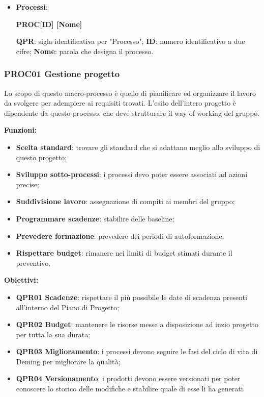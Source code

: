 \documentclass[../piano_di_qualifica.tex]{subfiles}
\begin{document}
\begin{itemize}
	\item \textbf{Processi}:
	      \begin{center}
		      \textbf{PROC[ID] [Nome]}
	      \end{center}
	      \subitem \textbf{QPR}: sigla identificativa per "Processo";
	      \subitem \textbf{ID}: numero identificativo a due cifre;
	      \subitem \textbf{Nome}: parola che designa il processo.
\end{itemize}

\subsubsection{PROC01 Gestione progetto}
Lo scopo di questo macro-processo è quello di pianificare ed organizzare il lavoro da svolgere per adempiere ai requisiti trovati. L'esito dell'intero progetto è dipendente da questo processo, che deve strutturare il way of working del gruppo.

\textbf{Funzioni:}
\smallbreak
\begin{itemize}
	\item \textbf{Scelta standard}: trovare gli standard che si adattano meglio allo sviluppo di questo progetto;
	\item \textbf{Sviluppo sotto-processi}: i processi devo poter essere associati ad azioni precise;
	\item \textbf{Suddivisione lavoro}: assegnazione di compiti ai membri del gruppo;
	\item \textbf{Programmare scadenze}: stabilire delle baseline;
	\item \textbf{Prevedere formazione}: prevedere dei periodi di autoformazione;
	\item \textbf{Rispettare budget}: rimanere nei limiti di budget stimati durante il preventivo.
\end{itemize}

\textbf{Obiettivi:}
\smallbreak
\begin{itemize}
	\item \textbf{QPR01 Scadenze}: rispettare il più possibile le date di scadenza presenti all'interno del Piano di Progetto;
	\item \textbf{QPR02 Budget}: mantenere le risorse messe a disposizione ad inzio progetto per tutta la sua durata;
	\item \textbf{QPR03 Miglioramento}: i processi devono seguire le fasi del ciclo di vita di Deming per migliorare la qualità;
	\item \textbf{QPR04 Versionamento}: i prodotti devono essere versionati per poter conoscere lo storico delle modifiche e stabilire quale di esse li ha generati.
\end{itemize}
\end{document}
